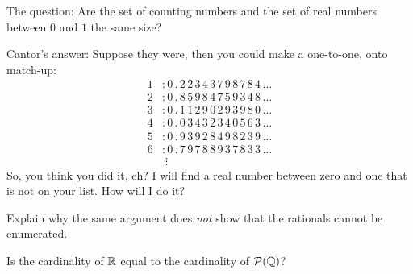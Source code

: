 \documentclass{ximera}
\begin{document}
\begin{question}
The question: Are the set of counting numbers and the set of real
numbers between $0$ and $1$ the same size?

Cantor's answer: Suppose they were, then you could make a one-to-one,
onto match-up:
\begin{align*}
1 &:0\,.\,2\,2\,3\,4\,3\,7\,9\,8\,7\,8\,4\,\dots\\
2 &:0\,.\,8\,5\,9\,8\,4\,7\,5\,9\,3\,4\,8\,\dots\\
3 &:0\,.\,1\,1\,2\,9\,0\,2\,9\,3\,9\,8\,0\,\dots\\
4 &:0\,.\,0\,3\,4\,3\,2\,3\,4\,0\,5\,6\,3\,\dots\\
5 &:0\,.\,9\,3\,9\,2\,8\,4\,9\,8\,2\,3\,9\,\dots\\
6 &:0\,.\,7\,9\,7\,8\,8\,9\,3\,7\,8\,3\,3\,\dots\\
  &\;\vdots
\end{align*}
So, you think you did it, eh?  I will find a real number between zero
and one that is not on your list.  How will I do it?
\end{question}

\begin{question}
Explain why the same argument does \textit{not} show that the
rationals cannot be enumerated.
\end{question}




\begin{exploration}
Is the cardinality of $\mathbb{R}$ equal to the cardinality of $\mathcal{P}(\mathbb{Q})$?
\end{exploration}
\end{document}
